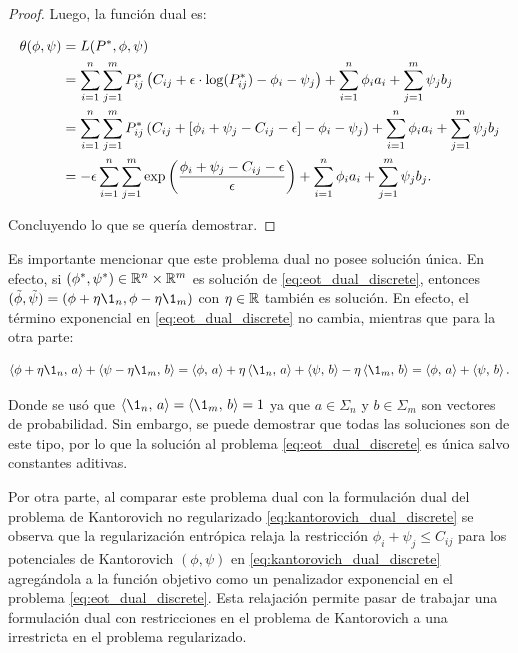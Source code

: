 \begin{proof}
	Luego, la función dual es:

	\begin{align*}
		\theta(\phi,\psi) & = L(P^*,\phi,\psi)\\
		                  & = \sum_{i=1}^n\sum_{j=1}^m P_{ij}^* \left( C_{ij} + \epsilon\cdot\log(P_{ij}^*)- \phi_i-\psi_j \right) + \sum_{i=1}^n \phi_i a_i + \sum_{j=1}^m \psi_j b_j\\
		                  & = \sum_{i=1}^n\sum_{j=1}^m P_{ij}^* \left( C_{ij} + [\phi_i+\psi_j-C_{ij}-\epsilon] - \phi_i-\psi_j \right) + \sum_{i=1}^n \phi_i a_i + \sum_{j=1}^m \psi_j b_j\\
		                  & = -\epsilon \sum_{i=1}^n\sum_{j=1}^m \exp\left(\frac{\phi_i + \psi_j-C_{ij} - \epsilon}{\epsilon}\right) + \sum_{i=1}^n \phi_i a_i + \sum_{j=1}^m \psi_j b_j .
	\end{align*}

	Concluyendo lo que se quería demostrar.
\end{proof}

Es importante mencionar que este problema dual no posee solución única. En efecto, si $(\phi^*,\psi^*)\in\mathbb{R}^n\times\mathbb{R}^m$ es solución de \eqref{eq:eot_dual_discrete}, entonces $(\tilde{\phi},\tilde{\psi}) = (\phi + \eta\1_n, \phi - \eta\1_m)$ con $\eta\in\mathbb{R}$ también es solución. En efecto, el término exponencial en \eqref{eq:eot_dual_discrete} no cambia, mientras que para la otra parte:

\begin{equation*}
	\dotproduct{\phi + \eta\1_n}{a} + \dotproduct{\psi - \eta\1_m}{b}
	= \dotproduct{\phi}{a} + \eta\dotproduct{\1_n}{a} + \dotproduct{\psi}{b} - \eta\dotproduct{\1_m}{b}
	= \dotproduct{\phi}{a} + \dotproduct{\psi}{b} .
\end{equation*}

Donde se usó que $\dotproduct{\1_n}{a}=\dotproduct{\1_m}{b}=1$ ya que $a\in\Sigma_n$ y $b\in\Sigma_m$ son vectores de probabilidad. Sin embargo, se puede demostrar que todas las soluciones son de este tipo, por lo que la solución al problema \eqref{eq:eot_dual_discrete} es única salvo constantes aditivas.

Por otra parte, al comparar este problema dual con la formulación dual del problema de Kantorovich no regularizado \eqref{eq:kantorovich_dual_discrete} se observa que la regularización entrópica relaja la restricción $\phi_i+\psi_j \leq C_{ij}$ para los potenciales de Kantorovich $(\phi,\psi)$ en \eqref{eq:kantorovich_dual_discrete} agregándola a la función objetivo como un penalizador exponencial en el problema \eqref{eq:eot_dual_discrete}. Esta relajación permite pasar de trabajar una formulación dual con restricciones en el problema de Kantorovich a una irrestricta en el problema regularizado.

